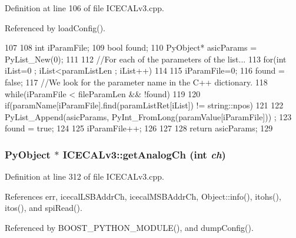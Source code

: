 Definition at line 106 of file ICECALv3.cpp.

Referenced by loadConfig().


\begin{DoxyCode}
107 {
108     int iParamFile;
109     bool found;
110     PyObject* asicParams = PyList_New(0);
111 
112     //For each of the parameters of the list...
113     for(int iList=0 ; iList<paramListLen ; iList++)
114     {
115         iParamFile=0;
116         found = false;
117         //We look for the parameter name in the C++ dictionary.
118         while(iParamFile < fileParamLen && !found)
119         {
120             if(paramName[iParamFile].find(paramListRet[iList]) != string::npos)
121             {
122                 PyList_Append(asicParams, PyInt_FromLong(paramValue[iParamFile]))
      ;
123                 found = true;
124             }
125             iParamFile++;
126         }
127     }
128     return asicParams;
129 }
\end{DoxyCode}
\hypertarget{classICECALv3_a5f1414e6049a82eafdd505a88d7d0c91}{
\subsubsection[{getAnalogCh}]{\setlength{\rightskip}{0pt plus 5cm}PyObject $\ast$ ICECALv3::getAnalogCh (int {\em ch})}}
\label{classICECALv3_a5f1414e6049a82eafdd505a88d7d0c91}


Definition at line 312 of file ICECALv3.cpp.

References err, icecalLSBAddrCh, icecalMSBAddrCh, Object::info(), itohs(), itos(), and spiRead().

Referenced by BOOST\_\-PYTHON\_\-MODULE(), and dumpConfig().


